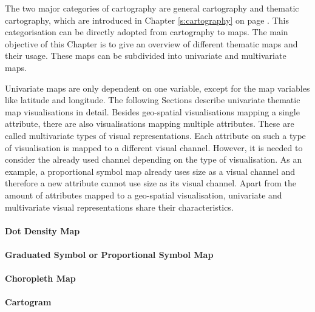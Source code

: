 The two major categories of cartography are general cartography and thematic cartography, which are introduced in Chapter \ref{s:cartography} on page \pageref{s:cartography}. This categorisation can be directly adopted from cartography to maps. The main objective of this Chapter is to give an overview of different thematic maps and their usage. These maps can be subdivided into univariate and multivariate maps.

\cbstart
Univariate maps are only dependent on one variable, except for the map variables like latitude and longitude. The following Sections describe univariate thematic map visualisations in detail. Besides geo-spatial visualisations mapping a single attribute, there are also visualisations mapping multiple attributes. These are called multivariate types of visual representations. Each attribute on such a type of visualisation is mapped to a different visual channel. However, it is needed to consider the already used channel depending on the type of visualisation. As an example, a proportional symbol map already uses size as a visual channel and therefore a new attribute cannot use size as its visual channel.
Apart from the amount of attributes mapped to a geo-spatial visualisation, univariate and multivariate visual representations share their characteristics.
\cbend

\paragraph{Dot Density Map}
\label{s:dot}


\paragraph{Graduated Symbol or Proportional Symbol Map}


\paragraph{Choropleth Map}

\label{s:choropleth}

\paragraph{Cartogram}


